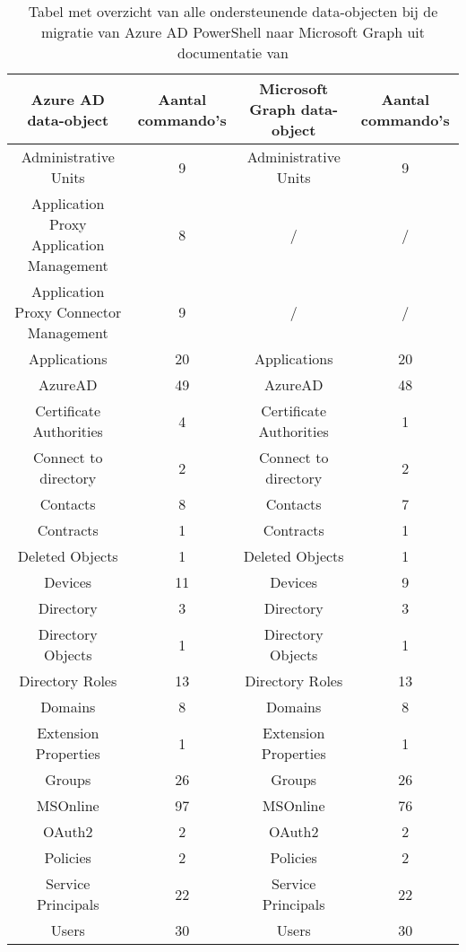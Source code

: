 \begin{table}
    \tiny
    \centering
    \begin{tabular}{ |c|c||c|c| } 
        \hline
        \textbf{Azure AD data-object} & \textbf{Aantal commando's} & \textbf{Microsoft Graph data-object} & \textbf{Aantal commando's} \\
        \hline
        Administrative Units & 9 & Administrative Units & 9 \\ 
        Application Proxy Application Management & 8 & / & / \\
        Application Proxy Connector Management & 9 & / & / \\
        Applications & 20 & Applications & 20 \\ 
        AzureAD & 49 & AzureAD & 48 \\ 
        Certificate Authorities & 4 & Certificate Authorities & 1 \\ 
        Connect to directory & 2 & Connect to directory & 2 \\ 
        Contacts & 8 & Contacts & 7 \\ 
        Contracts & 1 & Contracts & 1 \\ 
        Deleted Objects & 1 & Deleted Objects & 1 \\ 
        Devices & 11 & Devices & 9 \\    
        Directory & 3 & Directory & 3 \\
        Directory Objects & 1 & Directory Objects & 1 \\ 
        Directory Roles & 13 & Directory Roles & 13 \\ 
        Domains & 8 & Domains & 8 \\ 
        Extension Properties & 1 & Extension Properties & 1 \\ 
        Groups & 26 & Groups & 26 \\ 
        MSOnline & 97 & MSOnline & 76 \\
        OAuth2 & 2 & OAuth2 & 2 \\ 
        Policies & 2 & Policies & 2 \\ 
        Service Principals & 22 & Service Principals & 22 \\ 
        Users & 30 & Users & 30 \\ 
        \hline
    \end{tabular}
    \caption[Tabel migratie Azure AD data-objecten naar Microsoft Graph]{Tabel met overzicht van alle ondersteunende data-objecten bij de migratie van Azure \ac{AD} PowerShell naar Microsoft Graph uit documentatie van \textcite{Microsoft2023l}}
    \label{AADMSG}
\end{table}

